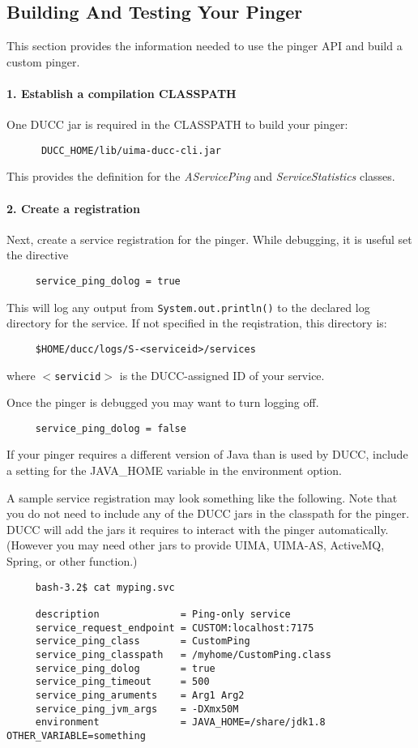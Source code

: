       \subsection{Building And Testing Your Pinger}
      This section provides the information needed to use the pinger API and build a
      custom pinger. 

      \paragraph{1. Establish a compilation CLASSPATH} One DUCC jar is required in the CLASSPATH to build your pinger:
\begin{verbatim}
      DUCC_HOME/lib/uima-ducc-cli.jar
\end{verbatim}      
      This provides the definition for the {\em AServicePing} and {\em ServiceStatistics} classes.

      \paragraph{2. Create a registration}Next, create a service registration for the pinger.  While
      debugging, it is useful set the directive
\begin{verbatim}
     service_ping_dolog = true
\end{verbatim}
      This will log any output from  {\tt System.out.println()} to the declared log directory
      for the service.  If not specified in the reqistration, this directory is:
\begin{verbatim}
     $HOME/ducc/logs/S-<serviceid>/services
\end{verbatim}
      where {\tt$<$servicid$>$} is the DUCC-assigned ID of your service.

      Once the pinger is debugged you may want to turn logging off.
\begin{verbatim}
     service_ping_dolog = false
\end{verbatim}

      If your pinger requires a different version of Java than is used by DUCC, include a
      setting for the JAVA\_HOME variable in the environment option.

      A sample service registration may look something like the following.  Note that you do not need
      to include any of the DUCC jars in the classpath for the pinger.  DUCC will add the jars it
      requires to interact with the pinger automatically.  (However you may need other jars to
      provide UIMA, UIMA-AS, ActiveMQ, Spring, or other function.)
\begin{verbatim}
     bash-3.2$ cat myping.svc

     description              = Ping-only service
     service_request_endpoint = CUSTOM:localhost:7175
     service_ping_class       = CustomPing
     service_ping_classpath   = /myhome/CustomPing.class
     service_ping_dolog       = true
     service_ping_timeout     = 500
     service_ping_aruments    = Arg1 Arg2
     service_ping_jvm_args    = -DXmx50M
     environment              = JAVA_HOME=/share/jdk1.8 OTHER_VARIABLE=something
\end{verbatim}
       
